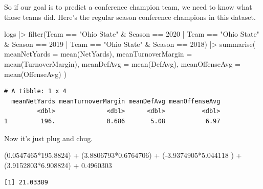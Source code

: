 \documentclass[
  letterpaper,
  DIV=11,
  numbers=noendperiod]{scrreprt}
\newenvironment{Shaded}{\begin{snugshade}}{\end{snugshade}}
\newcommand{\AttributeTok}[1]{\textcolor[rgb]{0.40,0.45,0.13}{#1}}
\newcommand{\DecValTok}[1]{\textcolor[rgb]{0.68,0.00,0.00}{#1}}
\newcommand{\FloatTok}[1]{\textcolor[rgb]{0.68,0.00,0.00}{#1}}
\newcommand{\FunctionTok}[1]{\textcolor[rgb]{0.28,0.35,0.67}{#1}}
\newcommand{\NormalTok}[1]{\textcolor[rgb]{0.00,0.23,0.31}{#1}}
\newcommand{\SpecialCharTok}[1]{\textcolor[rgb]{0.37,0.37,0.37}{#1}}
\newcommand{\StringTok}[1]{\textcolor[rgb]{0.13,0.47,0.30}{#1}}
\begin{document}
So if our goal is to predict a conference champion team, we need to know
what those teams did. Here's the regular season conference champions in
this dataset.

\begin{Shaded}
\begin{Highlighting}[]
\NormalTok{logs }\SpecialCharTok{|\textgreater{}} 
  \FunctionTok{filter}\NormalTok{(Team }\SpecialCharTok{==} \StringTok{"Ohio State"} \SpecialCharTok{\&}\NormalTok{ Season }\SpecialCharTok{==} \DecValTok{2020} \SpecialCharTok{|}\NormalTok{ Team }\SpecialCharTok{==} \StringTok{"Ohio State"} \SpecialCharTok{\&}\NormalTok{ Season }\SpecialCharTok{==} \DecValTok{2019} \SpecialCharTok{|}\NormalTok{ Team }\SpecialCharTok{==} \StringTok{"Ohio State"} \SpecialCharTok{\&}\NormalTok{ Season }\SpecialCharTok{==} \DecValTok{2018}\NormalTok{) }\SpecialCharTok{|\textgreater{}} 
  \FunctionTok{summarise}\NormalTok{(}
    \AttributeTok{meanNetYards =} \FunctionTok{mean}\NormalTok{(NetYards),}
    \AttributeTok{meanTurnoverMargin =} \FunctionTok{mean}\NormalTok{(TurnoverMargin),}
    \AttributeTok{meanDefAvg =} \FunctionTok{mean}\NormalTok{(DefAvg),}
    \AttributeTok{meanOffenseAvg =} \FunctionTok{mean}\NormalTok{(OffenseAvg)}
\NormalTok{  )}
\end{Highlighting}
\end{Shaded}

\begin{verbatim}
# A tibble: 1 x 4
  meanNetYards meanTurnoverMargin meanDefAvg meanOffenseAvg
         <dbl>              <dbl>      <dbl>          <dbl>
1         196.              0.686       5.08           6.97
\end{verbatim}

Now it's just plug and chug.

\begin{Shaded}
\begin{Highlighting}[]
\NormalTok{(}\FloatTok{0.0547465}\SpecialCharTok{*}\FloatTok{195.8824}\NormalTok{) }\SpecialCharTok{+}\NormalTok{ (}\FloatTok{3.8806793}\SpecialCharTok{*}\FloatTok{0.6764706}\NormalTok{) }\SpecialCharTok{+}\NormalTok{ (}\SpecialCharTok{{-}}\FloatTok{3.9374905}\SpecialCharTok{*}\FloatTok{5.044118}\NormalTok{ ) }\SpecialCharTok{+}\NormalTok{ (}\FloatTok{3.9152803}\SpecialCharTok{*}\FloatTok{6.908824}\NormalTok{) }\SpecialCharTok{+} \FloatTok{0.4960303}
\end{Highlighting}
\end{Shaded}

\begin{verbatim}
[1] 21.03389
\end{verbatim}
\end{document}
